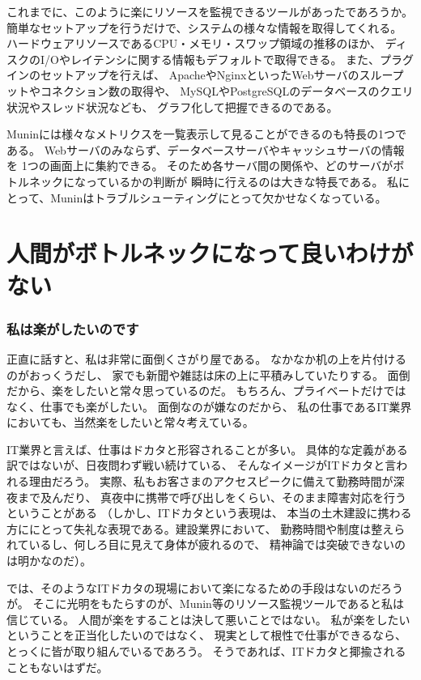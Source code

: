 これまでに、このように楽にリソースを監視できるツールがあったであろうか。
簡単なセットアップを行うだけで、システムの様々な情報を取得してくれる。
ハードウェアリソースであるCPU・メモリ・スワップ領域の推移のほか、
ディスクのI/Oやレイテンシに関する情報もデフォルトで取得できる。
また、プラグインのセットアップを行えば、
ApacheやNginxといったWebサーバのスループットやコネクション数の取得や、
MySQLやPostgreSQLのデータベースのクエリ状況やスレッド状況なども、
グラフ化して把握できるのである。

Muninには様々なメトリクスを一覧表示して見ることができるのも特長の1つである。
Webサーバのみならず、データベースサーバやキャッシュサーバの情報を
1つの画面上に集約できる。
そのため各サーバ間の関係や、どのサーバがボトルネックになっているかの判断が
瞬時に行えるのは大きな特長である。
私にとって、Muninはトラブルシューティングにとって欠かせなくなっている。

\section{人間がボトルネックになって良いわけがない}
\subsubsection{私は楽がしたいのです}
正直に話すと、私は非常に面倒くさがり屋である。
なかなか机の上を片付けるのがおっくうだし、
家でも新聞や雑誌は床の上に平積みしていたりする。
面倒だから、楽をしたいと常々思っているのだ。
もちろん、プライベートだけではなく、仕事でも楽がしたい。
面倒なのが嫌なのだから、
私の仕事であるIT業界においても、当然楽をしたいと常々考えている。

IT業界と言えば、仕事はドカタと形容されることが多い。
具体的な定義がある訳ではないが、日夜問わず戦い続けている、
そんなイメージがITドカタと言われる理由だろう。
実際、私もお客さまのアクセスピークに備えて勤務時間が深夜まで及んだり、
真夜中に携帯で呼び出しをくらい、そのまま障害対応を行うということがある
（しかし、ITドカタという表現は、
本当の土木建設に携わる方ににとって失礼な表現である。建設業界において、
勤務時間や制度は整えられているし、何しろ目に見えて身体が疲れるので、
精神論では突破できないのは明かなのだ）。

では、そのようなITドカタの現場において楽になるための手段はないのだろうが。
そこに光明をもたらすのが、Munin等のリソース監視ツールであると私は信じている。
人間が楽をすることは決して悪いことではない。
私が楽をしたいということを正当化したいのではなく、
現実として根性で仕事ができるなら、とっくに皆が取り組んでいるであろう。
そうであれば、ITドカタと揶揄されることもないはずだ。


